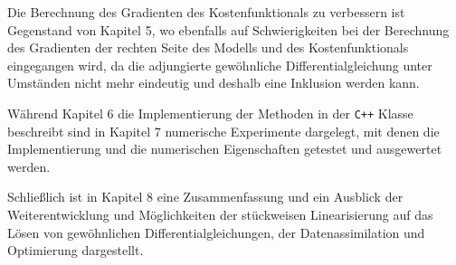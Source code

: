 Die Berechnung des Gradienten des Kostenfunktionals zu verbessern ist Gegenstand von Kapitel 5, wo ebenfalls auf Schwierigkeiten bei der Berechnung des Gradienten der rechten Seite des Modells und des Kostenfunktionals eingegangen wird, da die adjungierte gewöhnliche Differentialgleichung unter Umständen nicht mehr eindeutig und deshalb eine Inklusion werden kann.

Während Kapitel 6 die Implementierung der Methoden in der \texttt{C++} Klasse  beschreibt sind in Kapitel 7 numerische Experimente dargelegt, mit denen die Implementierung und die numerischen Eigenschaften getestet und ausgewertet werden.

Schließlich ist in Kapitel 8 eine Zusammenfassung und ein Ausblick der Weiterentwicklung und Möglichkeiten der stückweisen Linearisierung auf das Lösen von gewöhnlichen Differentialgleichungen, der Datenassimilation und Optimierung dargestellt.